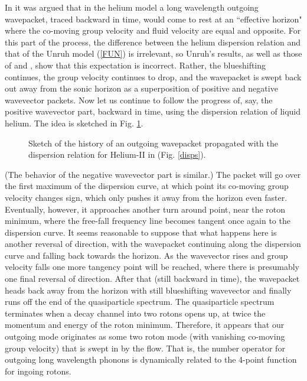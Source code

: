 In \cite{Jaco1} it was argued that in the helium model a long
wavelength outgoing wavepacket, traced backward in time, would come to
rest at an ``effective horizon" where the co-moving group velocity and
fluid velocity are equal and opposite. For this part of the process,
the difference between the helium dispersion relation and that of the
Unruh model (\ref{FUN}) is irrelevant, so Unruh's results\cite{Unruh2},
as well as those of \cite{BMPS} and \cite{CorlJaco}, show that this
expectation is incorrect. Rather, the blueshifting continues, the group
velocity continues to drop, and the wavepacket is swept back out away
from the sonic horizon as a superposition of positive and negative
wavevector packets. Now let us continue to follow the progress of, say,
the positive wavevector part, backward in time, using the dispersion
relation of liquid helium.  The idea is sketched in Fig. \ref{dance}.
\begin{figure}[tb]
\centerline{
}
\caption{Sketch of the history of an outgoing wavepacket
propagated with the dispersion relation for Helium-II in (Fig. \ref{disps}).}
\label{dance}
\end{figure}
(The behavior of the negative wavevector part is similar.) The packet
will go over the first maximum of the dispersion curve, at which point
its co-moving group velocity changes sign, which only pushes it away
from the horizon even faster.  Eventually, however, it approaches
another turn around point, near the roton minimum, where the free-fall
frequency line becomes tangent once again to the dispersion curve. It
seems reasonable to suppose that what happens here is another reversal
of direction, with the wavepacket continuing along the dispersion curve
and falling back towards the horizon. As the wavevector rises and group
velocity falls one more tangency point will be reached, where there is
presumably one final reversal of direction. After that (still backward
in time), the wavepacket heads back away from the horizon with still
blueshifting wavevector and finally runs off the end of the
quasiparticle spectrum.  The quasiparticle spectrum terminates when a
decay channel into two rotons opens up, at twice the momentum and
energy of the roton minimum\cite{Pita59,Khal}.  Therefore, it appears
that our outgoing mode originates as some two roton mode (with
vanishing co-moving group velocity) that is swept in by the flow. That
is, the number operator for outgoing long wavelength phonons is
dynamically related to the 4-point function for ingoing rotons.

